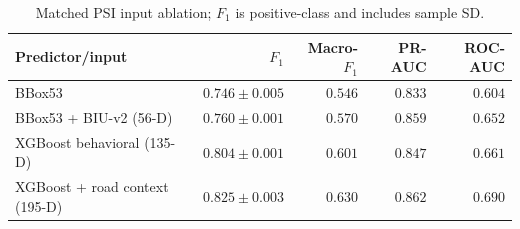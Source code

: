 \begin{table}[!htbp]
\centering
\caption{Matched PSI input ablation; $F_1$ is positive-class and includes sample SD.}\label{tab:ch4_psi}
\begin{tabularx}{\textwidth}{@{}Xrrrr@{}}\toprule
\textbf{Predictor/input} & \textbf{\boldmath $F_1$} & \textbf{\boldmath Macro-$F_1$} & \textbf{PR-AUC} & \textbf{ROC-AUC} \\[3pt]
\midrule
BBox53 & $0.746\pm0.005$ & $0.546$ & $0.833$ & $0.604$\\[3pt]
BBox53 + BIU-v2 (56-D) & $0.760\pm0.001$ & $0.570$ & $0.859$ & $0.652$\\[3pt]
XGBoost behavioral (135-D) & $0.804\pm0.001$ & $0.601$ & $0.847$ & $0.661$\\[3pt]
XGBoost + road context (195-D) & $\mathbf{0.825}\pm0.003$ & $\mathbf{0.630}$ & $\mathbf{0.862}$ & $\mathbf{0.690}$\\[3pt]
\bottomrule
\end{tabularx}
\end{table}
